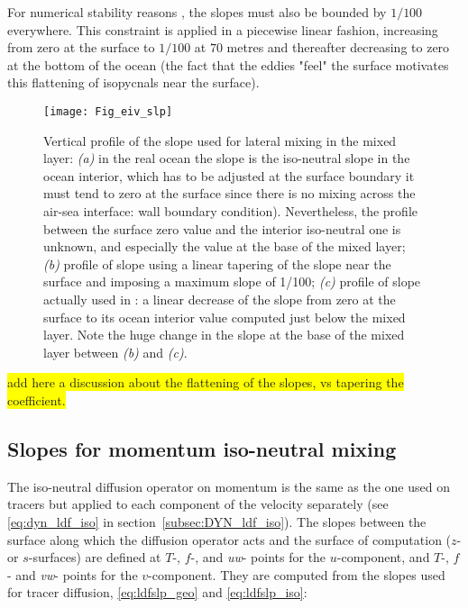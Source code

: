 \documentclass[../main/NEMO_manual]{subfiles}
\begin{document}
For numerical stability reasons \citep{Cox1987, Griffies_Bk04}, the slopes must also be bounded by
$1/100$ everywhere.
This constraint is applied in a piecewise linear fashion, increasing from zero at the surface to
$1/100$ at $70$ metres and thereafter decreasing to zero at the bottom of the ocean
(the fact that the eddies "feel" the surface motivates this flattening of isopycnals near the surface).

\begin{figure}[!ht]
  \begin{center}
    \texttt{[image: Fig\_eiv\_slp]}
    \caption{
      \protect\label{fig:eiv_slp}
      Vertical profile of the slope used for lateral mixing in the mixed layer:
      \textit{(a)} in the real ocean the slope is the iso-neutral slope in the ocean interior,
      which has to be adjusted at the surface boundary
      \ie it must tend to zero at the surface since there is no mixing across the air-sea interface:
      wall boundary condition).
      Nevertheless, the profile between the surface zero value and the interior iso-neutral one is unknown,
      and especially the value at the base of the mixed layer;
      \textit{(b)} profile of slope using a linear tapering of the slope near the surface and
      imposing a maximum slope of 1/100;
      \textit{(c)} profile of slope actually used in \NEMO: a linear decrease of the slope from
      zero at the surface to its ocean interior value computed just below the mixed layer.
      Note the huge change in the slope at the base of the mixed layer between \textit{(b)} and \textit{(c)}.
    }
  \end{center}
\end{figure}

\colorbox{yellow}{add here a discussion about the flattening of the slopes, vs tapering the coefficient.}

\subsection{Slopes for momentum iso-neutral mixing}

The iso-neutral diffusion operator on momentum is the same as the one used on tracers but
applied to each component of the velocity separately
(see \autoref{eq:dyn_ldf_iso} in section~\autoref{subsec:DYN_ldf_iso}).
The slopes between the surface along which the diffusion operator acts and the surface of computation
($z$- or $s$-surfaces) are defined at $T$-, $f$-, and \textit{uw}- points for the $u$-component, and $T$-, $f$- and
\textit{vw}- points for the $v$-component.
They are computed from the slopes used for tracer diffusion,
\ie \autoref{eq:ldfslp_geo} and \autoref{eq:ldfslp_iso}:
\end{document}
